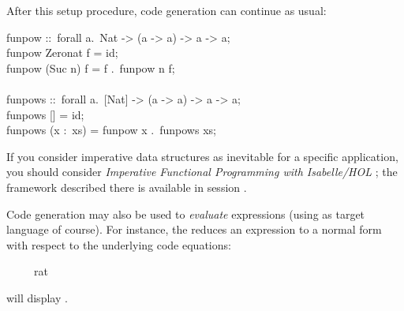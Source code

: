 \begin{isabellebody}
\begin{isamarkuptext}
  After this setup procedure, code generation can continue as usual:%
\end{isamarkuptext}%
\isamarkuptrue%
%
\isadelimquote
%
\endisadelimquote
%
\isatagquote
%
\begin{isamarkuptext}%
\isatypewriter%
\noindent%
\hspace*{0pt}funpow ::~forall a.~Nat -> (a -> a) -> a -> a;\\
\hspace*{0pt}funpow Zero{}nat f = id;\\
\hspace*{0pt}funpow (Suc n) f = f .~funpow n f;\\
\hspace*{0pt}\\
\hspace*{0pt}funpows ::~forall a.~[Nat] -> (a -> a) -> a -> a;\\
\hspace*{0pt}funpows [] = id;\\
\hspace*{0pt}funpows (x :~xs) = funpow x .~funpows xs;%
\end{isamarkuptext}%
\isamarkuptrue%
%
\endisatagquote
{\isafoldquote}%
%
\isadelimquote
%
\endisadelimquote
%
\isamarkuptrue%
%
\begin{isamarkuptext}%
If you consider imperative data structures as inevitable for a
  specific application, you should consider \emph{Imperative
  Functional Programming with Isabelle/HOL}
  \cite{bulwahn-et-al:2008:imperative}; the framework described there
  is available in session \hyperlink{theory.Imperative-HOL}{\mbox{}}.%
\end{isamarkuptext}%
\isamarkuptrue%
%
\isamarkuptrue%
%
\begin{isamarkuptext}%
Code generation may also be used to \emph{evaluate} expressions
  (using  as target language of course).
  For instance, the \hypertarget{command.value}{\hyperlink{command.value}{\mbox{}}} reduces an expression to a
  normal form with respect to the underlying code equations:%
\end{isamarkuptext}%
\isamarkuptrue%
%
\isadelimquote
%
\endisadelimquote
%
\isatagquote
{}\isamarkupfalse%
\ {\isachardoublequoteopen}{}{}\ {\isacharslash}\ {\isacharparenleft}{}{}\ {\isacharcolon}{\isacharcolon}\ rat{\isacharparenright}{\isachardoublequoteclose}%
\endisatagquote
{\isafoldquote}%
%
\isadelimquote
%
\endisadelimquote
%
\begin{isamarkuptext}%
\noindent will display .


\end{isamarkuptext}
\end{isabellebody}

